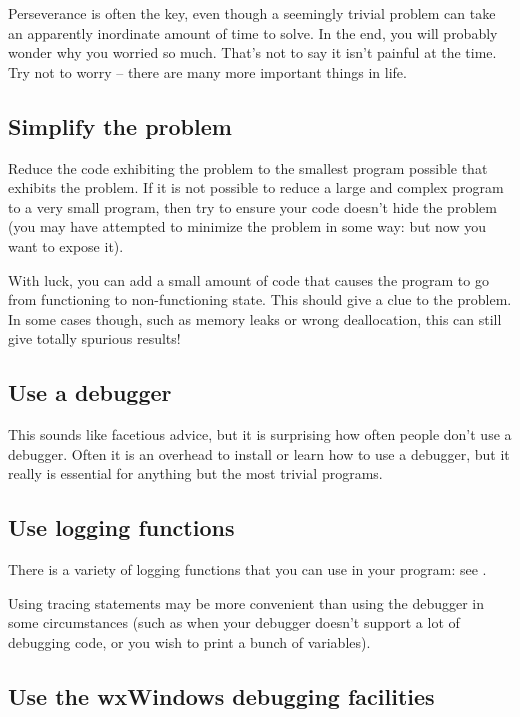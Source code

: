 Perseverance is often the key, even though a seemingly trivial problem
can take an apparently inordinate amount of time to solve. In the end,
you will probably wonder why you worried so much. That's not to say it
isn't painful at the time. Try not to worry -- there are many more important
things in life.

\subsection{Simplify the problem}

Reduce the code exhibiting the problem to the smallest program possible
that exhibits the problem. If it is not possible to reduce a large and
complex program to a very small program, then try to ensure your code
doesn't hide the problem (you may have attempted to minimize the problem
in some way: but now you want to expose it).

With luck, you can add a small amount of code that causes the program
to go from functioning to non-functioning state. This should give a clue
to the problem. In some cases though, such as memory leaks or wrong
deallocation, this can still give totally spurious results!

\subsection{Use a debugger}

This sounds like facetious advice, but it is surprising how often people
don't use a debugger. Often it is an overhead to install or learn how to
use a debugger, but it really is essential for anything but the most
trivial programs.

\subsection{Use logging functions}

There is a variety of logging functions that you can use in your program:
see .

Using tracing statements may be more convenient than using the debugger
in some circumstances (such as when your debugger doesn't support a lot
of debugging code, or you wish to print a bunch of variables).

\subsection{Use the wxWindows debugging facilities}

